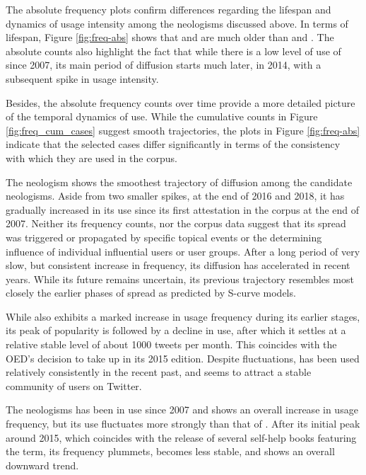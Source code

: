 \documentclass[
  a4paper,
  abstract=on,
  captions=tableabove
  ]{scrartcl}
\begin{document}
      The absolute frequency plots confirm differences regarding the lifespan and dynamics of usage intensity among the neologisms discussed above. In terms of lifespan, Figure \ref{fig:freq-abs} shows that  and  are much older than  and . The absolute counts also highlight the fact that while there is a low level of use of  since 2007, its main period of diffusion starts much later, in 2014, with a subsequent spike in usage intensity.


        Besides, the absolute frequency counts over time provide a more detailed picture of the temporal dynamics of use. While the cumulative counts in Figure \ref{fig:freq_cum_cases} suggest smooth trajectories, the plots in Figure \ref{fig:freq-abs} indicate that the selected cases differ significantly in terms of the consistency with which they are used in the corpus.

         The neologism  shows the smoothest trajectory of diffusion among the candidate neologisms. Aside from two smaller spikes, at the end of 2016 and 2018, it has gradually increased in its use since its first attestation in the corpus at the end of 2007. Neither its frequency counts, nor the corpus data suggest that its spread was triggered or propagated by specific topical events or the determining influence of individual influential users or user groups. After a long period of very slow, but consistent increase in frequency, its diffusion has accelerated in recent years. While its future remains uncertain, its previous trajectory resembles most closely the earlier phases of spread as predicted by S-curve models.

         While  also exhibits a marked increase in usage frequency during its earlier stages, its peak of popularity is followed by a decline in use, after which it settles at a relative stable level of about \num{1000} tweets per month. This coincides with the OED's decision to take up  in its 2015 edition. Despite fluctuations,  has been used relatively consistently in the recent past, and seems to attract a stable community of users on Twitter.

         The neologisms  has been in use since 2007 and shows an overall increase in usage frequency, but its use fluctuates more strongly than that of . After its initial peak around 2015, which coincides with the release of several self-help books featuring the term, its frequency plummets, becomes less stable, and shows an overall downward trend.
\end{document}
